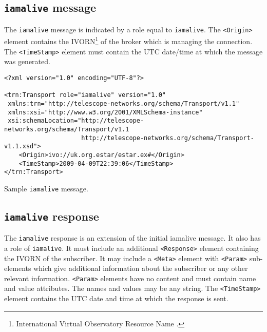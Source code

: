 \documentclass[a4paper,11pt]{ivoa}
\begin{document}
\subsection{\texttt{iamalive} message}

The \texttt{iamalive} message is indicated by a role equal to
\texttt{iamalive}. The \texttt{<Origin>} element contains the
IVORN\footnote{International Virtual Observatory Resource Name
\citep{Plante:2007}.} of the broker which is managing the connection.  The
\texttt{<TimeStamp>} element must contain the UTC date/time at which the
message was generated.

\begin{listing*}
\begin{verbatim}
<?xml version="1.0" encoding="UTF-8"?>

<trn:Transport role="iamalive" version="1.0"
 xmlns:trn="http://telescope-networks.org/schema/Transport/v1.1"
 xmlns:xsi="http://www.w3.org/2001/XMLSchema-instance"
 xsi:schemaLocation="http://telescope-networks.org/schema/Transport/v1.1
                     http://telescope-networks.org/schema/Transport-v1.1.xsd">
    <Origin>ivo://uk.org.estar/estar.ex#</Origin>
    <TimeStamp>2009-04-09T22:39:06</TimeStamp>
</trn:Transport>
\end{verbatim}
\caption{Sample \texttt{iamalive} message.}
\label{lst:iamalive}
\end{listing*}

\subsection{\texttt{iamalive} response}

The \texttt{iamalive} response is an extension of the initial iamalive
message. It also has a role of \texttt{iamalive}. It must include an
additional \texttt{<Response>} element containing the IVORN of the subscriber.
It may include a \texttt{<Meta>} element with \texttt{<Param>} sub-elements
which give additional information about the subscriber or any other relevant
information. \texttt{<Param>} elements have no content and must contain name
and value attributes. The names and values may be any string. The
\texttt{<TimeStamp>} element contains the UTC date and time at which the
response is sent.
\end{document}
